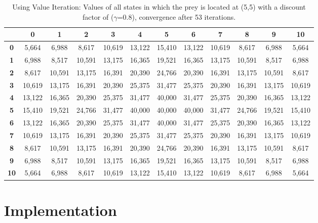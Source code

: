 \documentclass[11pt]{article}
\begin{document}
\begin{center}
\begin{table*}[ht]
{\small
\hfill{}
\begin{tabular}{c|c|c|c|c|c|c|c|c|c|c|c}
\textbf{} & \textbf{0} & \textbf{1} & \textbf{2} & \textbf{3} & \textbf{4} & \textbf{5} & \textbf{6} & \textbf{7} & \textbf{8} & \textbf{9} & \textbf{10}\\
	\hline
\textbf{0} & 5,664 & 6,988 & 8,617 & 10,619 & 13,122 & 15,410 & 13,122 & 10,619 & 8,617 & 6,988 & 5,664\\
\textbf{1} & 6,988 & 8,517 & 10,591 & 13,175 & 16,365 & 19,521 & 16,365 & 13,175 & 10,591 & 8,517 & 6,988\\
\textbf{2} & 8,617 & 10,591 & 13,175 & 16,391 & 20,390 & 24,766 & 20,390 & 16,391 & 13,175 & 10,591 & 8,617\\
\textbf{3} & 10,619 & 13,175 & 16,391 & 20,390 & 25,375 & 31,477 & 25,375 & 20,390 & 16,391 & 13,175 & 10,619\\
\textbf{4} & 13,122 & 16,365 & 20,390 & 25,375 & 31,477 & 40,000 & 31,477 & 25,375 & 20,390 & 16,365 & 13,122\\
\textbf{5} & 15,410 & 19,521 & 24,766 & 31,477 & 40,000 & 40,000 & 40,000 & 31,477 & 24,766 & 19,521 & 15,410\\
\textbf{6} & 13,122 & 16,365 & 20,390 & 25,375 & 31,477 & 40,000 & 31,477 & 25,375 & 20,390 & 16,365 & 13,122\\
\textbf{7} & 10,619 & 13,175 & 16,391 & 20,390 & 25,375 & 31,477 & 25,375 & 20,390 & 16,391 & 13,175 & 10,619\\
\textbf{8} & 8,617 & 10,591 & 13,175 & 16,391 & 20,390 & 24,766 & 20,390 & 16,391 & 13,175 & 10,591 & 8,617\\
\textbf{9} & 6,988 & 8,517 & 10,591 & 13,175 & 16,365 & 19,521 & 16,365 & 13,175 & 10,591 & 8,517 & 6,988\\
\textbf{10} & 5,664 & 6,988 & 8,617 & 10,619 & 13,122 & 15,410 & 13,122 & 10,619 & 8,617 & 6,988 & 5,664\\
\end{tabular}}
\hfill{}
\caption{Using Value Iteration: Values of all states in which the prey is located at (5,5) with a discount factor of ($\gamma$=0.8), convergence after 53 iterations.}
\label{table:outputValIter}
\end{table*}
\end{center}

\section{Implementation}
\end{document}
